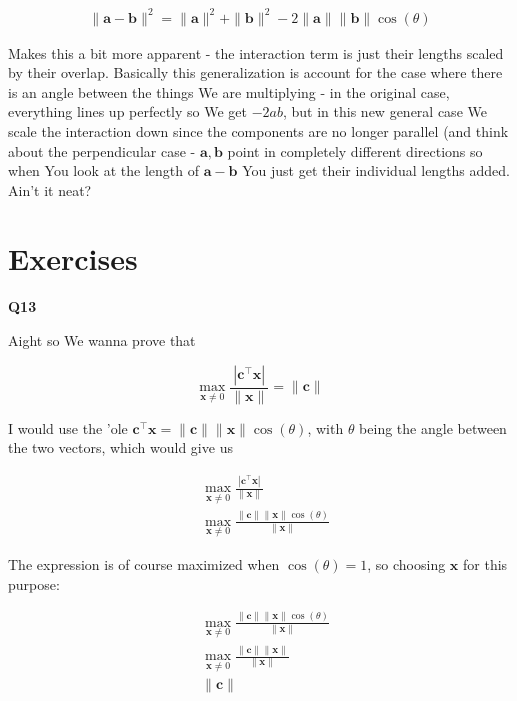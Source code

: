\documentclass{article}
\begin{document}
		\begin{align*}
			\|\mathbf{a - b}\|^2 = \|\mathbf{a}\|^2 + \|\mathbf{b}\|^2 - 2\|\mathbf{a}\|\|\mathbf{b}\|\cos(\theta) 
		\end{align*}
		
		Makes this a bit more apparent - the interaction term is just their lengths scaled by their overlap. Basically this generalization is account for the case where there is an angle between the things We are multiplying - in the original case, everything lines up perfectly so We get $-2ab$, but in this new general case We scale the interaction down since the components are no longer parallel (and think about the perpendicular case - $\mathbf{a, b}$ point in completely different directions so when You look at the length of $\mathbf{a-b}$ You just get their individual lengths added. Ain't it neat?
		
		\newpage

\section{Exercises}

	\textbf{Q13}
	
		Aight so We wanna prove that
		
		\[ \max_{\mathbf{x}\neq 0} \frac{|\mathbf{c}^\top \mathbf{x}|}{\|\mathbf{x}\|} = \|\mathbf{c}\| \]
		
		I would use the 'ole $\mathbf{c}^\top\mathbf{x} = \|\mathbf{c}\|\|\mathbf{x}\|\cos(\theta)$, with $\theta$ being the angle between the two vectors, which would give us 
	
		\begin{align}
			&\max_{\mathbf{x}\neq 0} \frac{|\mathbf{c}^\top \mathbf{x}|}{\|\mathbf{x}\|}\\
			&\max_{\mathbf{x}\neq 0} \frac{\|\mathbf{c}\| \|\mathbf{x}\|\cos(\theta)}{\|\mathbf{x}\|} 
		\end{align}
		
		The expression is of course maximized when $\cos(\theta) = 1$, so choosing $\mathbf{x}$ for this purpose:
		
		\begin{align}
			&\max_{\mathbf{x}\neq 0} \frac{\|\mathbf{c}\| \|\mathbf{x}\|\cos(\theta)}{\|\mathbf{x}\|} \\
			&\max_{\mathbf{x}\neq 0} \frac{\|\mathbf{c}\| \|\mathbf{x}\|}{\|\mathbf{x}\|} \\
			&\|\mathbf{c}\|
		\end{align}
		
\end{document}
